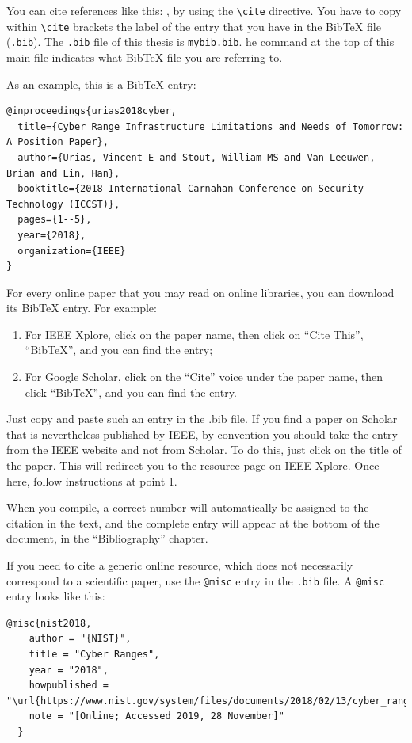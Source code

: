 \newpage
You can cite references like this: \cite{texbook} \cite{lamport94}, by using the \lstinline{\cite} directive. You have to copy within \lstinline{\cite} brackets the label of the entry that you have in the BibTeX file (\texttt{.bib}). The \texttt{.bib} file of this thesis is \texttt{mybib.bib}. he command \lstinline{} at the top of this main file indicates what BibTeX file you are referring to.

As an example, this is a BibTeX entry:

\begin{verbatim}
@inproceedings{urias2018cyber,
  title={Cyber Range Infrastructure Limitations and Needs of Tomorrow: A Position Paper},
  author={Urias, Vincent E and Stout, William MS and Van Leeuwen, Brian and Lin, Han},
  booktitle={2018 International Carnahan Conference on Security Technology (ICCST)},
  pages={1--5},
  year={2018},
  organization={IEEE}
}
\end{verbatim}

For every online paper that you may read on online libraries, you can download its BibTeX entry. For example:
\begin{enumerate}
	\item For IEEE Xplore, click on the paper name, then click on ``Cite This'', ``BibTeX'', and you can find the entry;
	\item For Google Scholar, click on the ``Cite'' voice under the paper name, then click ``BibTeX'', and you can find the entry.
\end{enumerate}

Just copy and paste such an entry in the .bib file. If you find a paper on Scholar that is nevertheless published by IEEE, by convention you should take the entry from the IEEE website and not from Scholar. To do this, just click on the title of the paper. This will redirect you to the resource page on IEEE Xplore. Once here, follow instructions at point 1.

When you compile, a correct number will automatically be assigned to the citation in the text, and the complete entry will appear at the bottom of the document, in the ``Bibliography'' chapter.

If you need to cite a generic online resource, which does not necessarily correspond to a scientific paper, use the \lstinline{@misc} entry in the \texttt{.bib} file. A \lstinline{@misc} entry looks like this:

\begin{verbatim}
@misc{nist2018,
    author = "{NIST}",
    title = "Cyber Ranges",
    year = "2018",
    howpublished = "\url{https://www.nist.gov/system/files/documents/2018/02/13/cyber_ranges.pdf}",
    note = "[Online; Accessed 2019, 28 November]"
  }
\end{verbatim}

